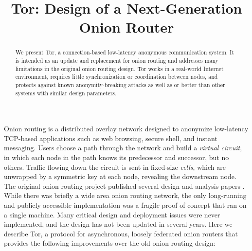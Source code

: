 \documentclass[times,10pt,twocolumn]{article}
\begin{document}

\title{Tor: Design of a Next-Generation Onion Router}


\maketitle
\thispagestyle{empty}

\begin{abstract}
We present Tor, a connection-based low-latency anonymous communication
system. It is intended as an update and replacement for onion routing
and addresses many limitations in the original onion routing design.
Tor works in a real-world Internet environment,
requires little synchronization or coordination between nodes, and
protects against known anonymity-breaking attacks as well
as or better than other systems with similar design parameters.
\end{abstract}



\label{sec:intro}

Onion routing is a distributed overlay network designed to anonymize
low-latency TCP-based applications such as web browsing, secure shell,
and instant messaging. Users choose a path through the network and
build a \emph{virtual circuit}, in which each node in the path knows its
predecessor and successor, but no others. Traffic flowing down the circuit
is sent in fixed-size \emph{cells}, which are unwrapped by a symmetric key
at each node, revealing the downstream node. The original onion routing
project published several design and analysis papers
\cite{or-jsac98,or-discex00,or-ih96,or-pet00}. While there was briefly
a wide area onion routing network,
the only long-running and publicly accessible
implementation was a fragile proof-of-concept that ran on a single
machine. Many critical design and deployment issues were never implemented,
and the design has not been updated in several years.
Here we describe Tor, a protocol for asynchronous, loosely
federated onion routers that provides the following improvements over
the old onion routing design:
\end{document}
